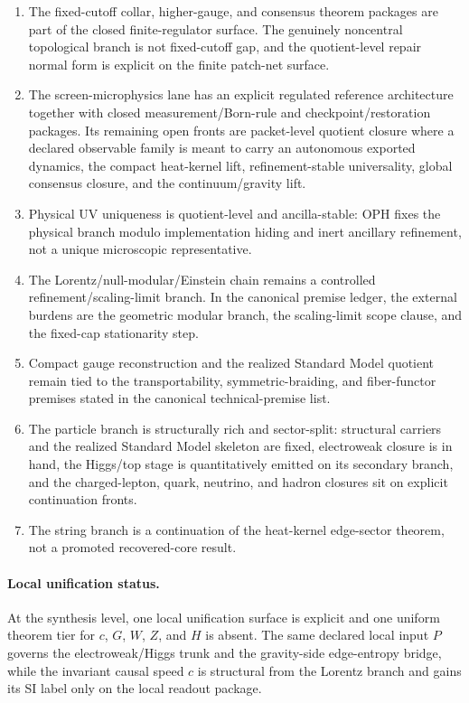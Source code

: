 \begin{enumerate}[leftmargin=2em]
\item The fixed-cutoff collar, higher-gauge, and consensus theorem packages are part of
the closed finite-regulator surface. The genuinely noncentral topological branch is not
fixed-cutoff gap, and the quotient-level repair normal form is explicit on the finite patch-net
surface.
\item The screen-microphysics lane has an explicit regulated reference architecture together
with closed measurement/Born-rule and checkpoint/restoration packages. Its remaining open fronts
are packet-level quotient closure where a declared observable family is meant to carry an
autonomous exported dynamics, the compact heat-kernel lift, refinement-stable universality,
global consensus closure, and the continuum/gravity lift.
\item Physical UV uniqueness is quotient-level and ancilla-stable: OPH fixes the physical branch
modulo implementation hiding and inert ancillary refinement, not a unique microscopic
representative.
\item The Lorentz/null-modular/Einstein chain remains a controlled refinement/scaling-limit
branch. In the canonical premise ledger, the external burdens are the geometric modular
branch, the scaling-limit scope clause, and the fixed-cap stationarity step.
\item Compact gauge reconstruction and the realized Standard Model quotient remain tied to the
transportability, symmetric-braiding, and fiber-functor premises stated in the canonical
technical-premise list.
\item The particle branch is structurally rich and sector-split: structural carriers and the
realized Standard Model skeleton are fixed, electroweak closure is in hand, the Higgs/top stage is
quantitatively emitted on its secondary branch, and the charged-lepton, quark, neutrino, and
hadron closures sit on explicit continuation fronts.
\item The string branch is a continuation of the heat-kernel edge-sector theorem, not a promoted
recovered-core result.
\end{enumerate}

\paragraph{Local unification status.}
At the synthesis level, one local unification surface is explicit and one uniform theorem tier for
\(c\), \(G\), \(W\), \(Z\), and \(H\) is absent. The same declared local input \(P\) governs the
electroweak/Higgs trunk and the gravity-side edge-entropy bridge, while the invariant causal speed
\(c\) is structural from the Lorentz branch and gains its SI label only on the local readout
package.

